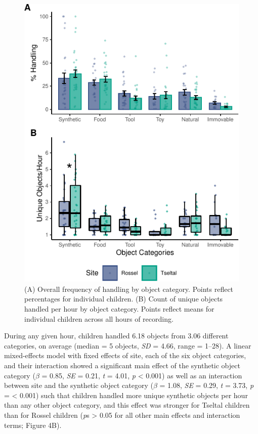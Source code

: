 \documentclass[10pt, letterpaper]{article}
\newenvironment{CodeChunk}{}{}
\begin{document}
\begin{CodeChunk}
\begin{figure}[!h]

{\centering \includegraphics{figs/overall-stats-fig-1} 

}

\caption[(A) Overall frequency of handling by object category]{(A) Overall frequency of handling by object category. Points reflect percentages for individual children. (B) Count of unique objects handled per hour by object category. Points reflect means for individual children across all hours of recording.}\label{fig:overall-stats-fig}
\end{figure}
\end{CodeChunk}

During any given hour, children handled 6.18 objects from 3.06 different
categories, on average (median = 5 objects, \emph{SD} = 4.66, range =
1--28). A linear mixed-effects model with fixed effects of site, each of
the six object categories, and their interaction showed a significant
main effect of the synthetic object category (\(\beta\) = 0.85,
\emph{SE} = 0.21, \emph{t} = 4.01, \emph{p} \textless{} 0.001) as well
as an interaction between site and the synthetic object category
(\(\beta\) = 1.08, \emph{SE} = 0.29, \emph{t} = 3.73, \emph{p} =
\textless{} 0.001) such that children handled more unique synthetic
objects per hour than any other object category, and this effect was
stronger for Tseltal children than for Rossel children (\emph{p}s
\textgreater{} 0.05 for all other main effects and interaction terms;
Figure 4B).
\end{document}
